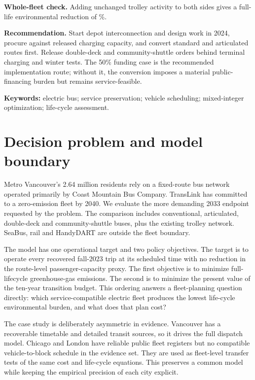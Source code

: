 \documentclass[12pt,letterpaper]{article}
\begin{document}
\textbf{Whole-fleet check.} Adding unchanged trolley activity to both sides gives a full-life environmental reduction of \%.

\textbf{Recommendation.} Start depot interconnection and design work in 2024, procure against released charging capacity, and convert standard and articulated routes first. Release double-deck and community-shuttle orders behind terminal charging and winter tests. The 50\% funding case is the recommended implementation route; without it, the conversion imposes a material public-financing burden but remains service-feasible.

\textbf{Keywords:} electric bus; service preservation; vehicle scheduling; mixed-integer optimization; life-cycle assessment.

\newpage
\tableofcontents
\newpage

\section{Decision problem and model boundary}

Metro Vancouver's 2.64 million residents rely on a fixed-route bus network operated primarily by Coast Mountain Bus Company. TransLink has committed to a zero-emission fleet by 2040. We evaluate the more demanding 2033 endpoint requested by the problem. The comparison includes conventional, articulated, double-deck and community-shuttle buses, plus the existing trolley network. SeaBus, rail and HandyDART are outside the fleet boundary.\cite{problem,vancouvercensus,fleet2020,playbook2024}

The model has one operational target and two policy objectives. The target is to operate every recovered fall-2023 trip at its scheduled time with no reduction in the route-level passenger-capacity proxy. The first objective is to minimize full-lifecycle greenhouse-gas emissions. The second is to minimize the present value of the ten-year transition budget. This ordering answers a fleet-planning question directly: which service-compatible electric fleet produces the lowest life-cycle environmental burden, and what does that plan cost?

The case study is deliberately asymmetric in evidence. Vancouver has a recoverable timetable and detailed transit sources, so it drives the full dispatch model. Chicago and London have reliable public fleet registers but no compatible vehicle-to-block schedule in the evidence set. They are used as fleet-level transfer tests of the same cost and life-cycle equations. This preserves a common model while keeping the empirical precision of each city explicit.
\end{document}
